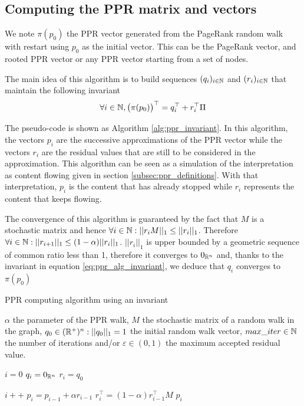 \subsection{Computing the PPR matrix and vectors}
We note $\pi(p_0)$ the PPR vector generated from the PageRank random walk with restart using $p_0$ as the initial vector. This can be the PageRank vector, and rooted PPR vector or any PPR vector starting from a set of nodes.

The main idea of this algorithm is to build sequences $(q_i)_{i\in \mathbb{N}}$ and $(r_i)_{i\in \mathbb{N}}$ that maintain the following invariant
\begin{equation}\label{eq:ppr_alg_invariant}
    \forall i \in \mathbb{N}, \big(\pi(p_0)\big)^\top = q_i^\top + r_i^\top\Pi
\end{equation}

The pseudo-code is shown as Algorithm \ref{alg:ppr_invariant}. In this algorithm, the vectors $p_i$ are the successive approximations of the PPR vector while the vectors $r_i$ are the residual values that are still to be considered in the approximation. This algorithm can be seen as a simulation of the interpretation as content flowing given in section \ref{subsec:ppr_definitions}. With that interpretation, $p_i$ is the content that has already stopped while $r_i$ represents the content that keeps flowing.

The convergence of this algorithm is guaranteed by the fact that $M$ is a stochastic matrix and hence $\forall i \in \mathbb{N} : ||r_iM||_1 \leq ||r_i||_1$. Therefore $\forall i \in \mathbb{N} : ||r_{i+1}||_1 \leq (1-\alpha)||r_i||_1$. $||r_i||_1$ is upper bounded by a geometric sequence of common ratio less than 1, therefore it converges to $0_{\mathbb{R}^n}$ and, thanks to the invariant in equation \ref{eq:ppr_alg_invariant}, we deduce that $q_i$ converges to $\pi(p_0)$

\begin{algorithm}
\caption{PPR computing algorithm using an invariant}
\label{alg:ppr_invariant}
\begin{algorithmic}[1]
    \Require $\alpha$ the parameter of the PPR walk, $M$ the stochastic matrix of a random walk in the graph, $q_0 \in (\mathbb{R}^+)^n : ||q_0||_1 = 1$ the initial random walk vector, $max\_iter\in \mathbb{N}$ the number of iterations and/or $\varepsilon \in (0, 1)$ the maximum accepted residual value.

    \State $i = 0$
    \State $q_i = 0_{\mathbb{R}^n}$
    \State $r_i = q_0$

        \State $i++$
        \State $p_i = p_{i-1} + \alpha r_{i-1}$
        \State $r_i^\top = (1-\alpha) r_{i - 1}^\top M$
    \EndWhile
    \State \Return $p_i$
\end{algorithmic}
\end{algorithm}

